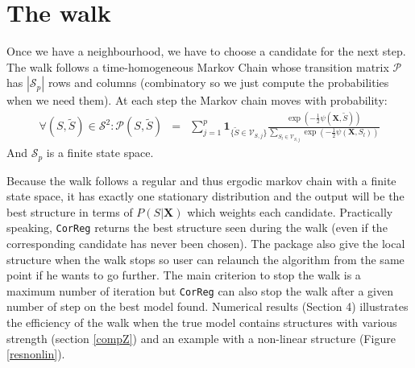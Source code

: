 \documentclass[12pt,a4paper]{report}
\begin{document}
	\section{The walk}
		Once we have a neighbourhood, we have to choose a candidate for the next step.
The walk follows a time-homogeneous Markov Chain whose transition matrix $\mathcal{P}$ has $|\mathcal{S}_p|$ rows and columns (combinatory so we just compute the probabilities when we need them).
	At each step the Markov chain moves with probability:
	\begin{eqnarray}
			\forall (S,\tilde{S}) \in \mathcal{S}^2 : \mathcal{P}(S,\tilde{S})&=&\sum_{j=1}^p \mathbf{1}_{ \{\tilde{S}\in \mathcal{V}_{S,j}\} }\frac{\exp(-\frac{1}{2}\psi(\boldsymbol{X},\tilde{S}))}{\sum_{S_l\in \mathcal{V}_{S,j}}\exp(-\frac{1}{2}\psi(\boldsymbol{X},S_l))} 
	\end{eqnarray}
	And $\mathcal{S}_p$ is a finite state space.%
	 
Because the walk follows a regular and thus ergodic markov chain with a finite state space, it has exactly one stationary distribution \cite{grinstead1997introduction} %
%	
%	
%		
and the output will be the best structure in terms of $P(S|\boldsymbol{X})$ which weights each candidate. Practically speaking, {\tt CorReg} returns the best structure seen during the walk (even if the corresponding candidate has never been chosen). The package also give the local structure when the walk stops so user can relaunch the algorithm from the same point if he wants to go further.
The main criterion to stop the walk is a maximum number of iteration but {\tt CorReg} can also stop the walk after a given number of step on the best model found.
Numerical results (Section 4) illustrates the efficiency of the walk when the true model contains structures with various strength (section \ref{compZ}) and an example with a non-linear structure (Figure \ref{resnonlin}).
		
\end{document}
